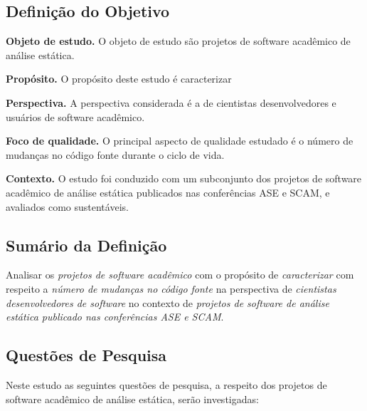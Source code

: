 \subsection{Definição do Objetivo}

\begin{description}
\item{\bf Objeto de estudo.}
O objeto de estudo são projetos de software acadêmico de análise estática.

\item{\bf Propósito.}
O propósito deste estudo é caracterizar 

\item{\bf Perspectiva.}
A perspectiva considerada é a de cientistas desenvolvedores e usuários de software acadêmico.

\item{\bf Foco de qualidade.}
O principal aspecto de qualidade estudado é o número de mudanças no código fonte durante o ciclo de vida.

\item{\bf Contexto.}
O estudo foi conduzido com um subconjunto dos projetos de software acadêmico de análise estática
publicados nas conferências ASE e SCAM, e avaliados como sustentáveis.
\end{description}

\subsection{Sumário da Definição}

Analisar os \textit{projetos de software acadêmico}
com o propósito de \textit{caracterizar}  %
com respeito a \textit{número de mudanças no código fonte}  %
na perspectiva de \textit{cientistas desenvolvedores de software}%
no contexto de \textit{projetos de software de análise estática publicado nas conferências ASE e SCAM}.

\subsection{Questões de Pesquisa}

Neste estudo as seguintes questões de pesquisa, a respeito dos projetos de
software acadêmico de análise estática, serão investigadas:

\newcommand{\EstudoTresQuestaoUm}{
  Em qual estágio de evolução estão os projetos de software acadêmico de análise
  estática dentro do seu ciclo de vida?
}

